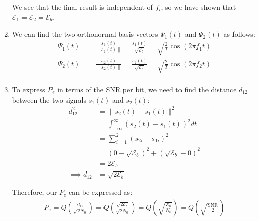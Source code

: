 \documentclass{article}
\begin{document}
\begin{enumerate}[label=2.\arabic*]
    We see that the final result is independent of $f_i$, so we have shown that $\mathcal{E}_1 = \mathcal{E}_2 = \mathcal{E}_b$.

    \item We can find the two orthonormal basis vectors $\Psi_1(t)$ and $\Psi_2(t)$ as follows:
    \begin{align*}
        \Psi_1(t) &= \frac{s_1(t)}{\|s_1(t)\|} = \frac{s_1(t)}{\sqrt{\mathcal{E}_b}} = \sqrt{\frac{2}{T}} \cos(2\pi f_1 t) \\
        \Psi_2(t) &= \frac{s_2(t)}{\|s_2(t)\|} = \frac{s_2(t)}{\sqrt{\mathcal{E}_b}} = \sqrt{\frac{2}{T}} \cos(2\pi f_2 t) \\
    \end{align*}

    \item To express $P_e$ in terms of the SNR per bit, we need to find the distance $d_{12}$ between the two signals $s_1(t)$ and $s_2(t)$:
    \begin{align*}
        d_{12}^2 &= \|s_2(t) - s_1(t)\|^2 \\
        &= \int_{-\infty}^{\infty} \left(s_2(t) - s_1(t)\right)^2 dt \\
        &= \sum_{i=1}^{2} (s_{2i} - s_{1i})^2 \\
        &= \left(0 - \sqrt{\mathcal{E}_b}\right)^2 + \left(\sqrt{\mathcal{E}_b} - 0\right)^2 \\
        &= 2\mathcal{E}_b \\
        \implies d_{12} &= \sqrt{2\mathcal{E}_b}
    \end{align*}

    Therefore, our $P_e$ can be expressed as:
    \begin{align*}
        P_e = Q\left(\frac{d_{12}}{\sqrt{2N_0}}\right) = Q\left(\frac{\sqrt{2\mathcal{E}_b}}{\sqrt{2N_0}}\right) = Q\left(\sqrt{\frac{\mathcal{E}_b}{N_0}}\right) = Q \left(\sqrt{\frac{\text{SNR}}{2}}\right)
    \end{align*}
\end{enumerate}
\end{document}
